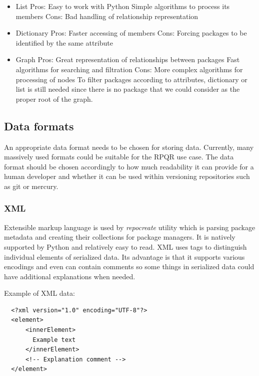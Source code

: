 \newpage

\begin{itemize}
  \item List
    \subitem Pros:
    \subsubitem Easy to work with Python
    \subsubitem Simple algorithms to process its members
    \subitem Cons:
    \subsubitem Bad handling of relationship representation
  \item Dictionary
    \subitem Pros:
    \subsubitem Faster accessing of members
    \subitem Cons:
    \subsubitem Forcing packages to be identified by the same attribute
  \item Graph
    \subitem Pros:
    \subsubitem Great representation of relationships between packages
    \subsubitem Fast algorithms for searching and filtration
    \subitem Cons:
    \subsubitem More complex algorithms for processing of nodes
    \subsubitem To filter packages according to attributes, dictionary or list is still needed
                since there is no package that we could consider as the proper root of the graph.
\end{itemize}

\subsection*{Data formats}
An appropriate data format needs to be chosen for storing data. Currently, many massively
used formats could be suitable for the RPQR use case. The data format should be chosen accordingly to
how much readability it can provide for a human developer and whether it can be used within versioning
repositories such as git or mercury.

\subsubsection*{XML}
Extensible markup language\cite{XMLFormat} is used by \textit{repocreate} utility which is parsing package metadata and creating
their collections for package managers. It is natively supported by Python and relatively easy to
read. XML uses tags to distinguish individual elements of serialized data. Its advantage
is that it supports various encodings and even can contain comments so some things in serialized
data could have additional explanations when needed.

\newpage

Example of XML data:
\begin{lstlisting}
  <?xml version="1.0" encoding="UTF-8"?>
  <element>
      <innerElement>
        Example text
      </innerElement>
      <!-- Explanation comment -->
  </element>
\end{lstlisting}

